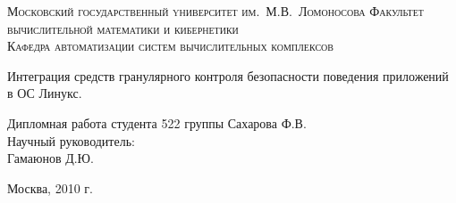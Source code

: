 \begin{titlepage}
	\begin{center}
	\textsc{\large{Московский государственный yниверситет им.~М.В.~Ломоносова}
	\normalsize{Факультет вычислительной математики и кибернетики\\
	Кафедра автоматизации систем вычислительных комплексов}}

	{\Large {Интеграция средств гранулярного контроля безопасности
                    поведения приложений в ОС Линукс.}} \\[3cm]
	\begin{flushright}
                Дипломная работа студента 522 группы
		Сахарова Ф.В.\\
		
		Научный руководитель:\\ 
		Гамаюнов Д.Ю.
	\end{flushright}
	\vfill
	
	Москва, 2010 г.
	\end{center}

\end{titlepage}

